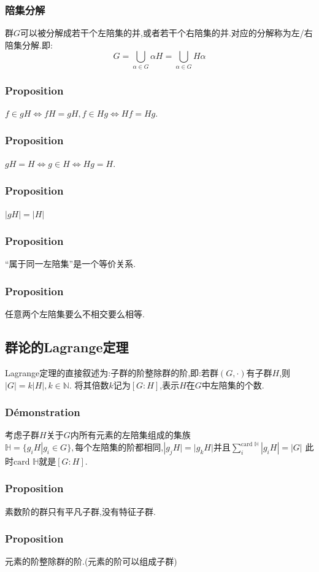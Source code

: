 \documentclass[12pt, a4paper, oneside]{ctexbook}
\begin{document}
  \subsubsection{陪集分解}
  群$G$可以被分解成若干个左陪集的并,或者若干个右陪集的并.对应的分解称为左/右陪集分解.即:
  $$
  G=\bigcup_{\alpha\in G}\alpha H= \bigcup_{\alpha\in G}H\alpha
  $$
  \subsubsection{Proposition}
  $f\in gH\Leftrightarrow fH=gH,f\in Hg\Leftrightarrow Hf=Hg$.
  \subsubsection{Proposition}
  $gH=H\Leftrightarrow g\in H\Leftrightarrow Hg=H$.
  \subsubsection{Proposition}
  $|gH|=|H|$
  \subsubsection{Proposition}
  “属于同一左陪集”是一个等价关系.
  \subsubsection{Proposition}
  任意两个左陪集要么不相交要么相等.

  \subsection{群论的Lagrange定理}
  Lagrange定理的直接叙述为:子群的阶整除群的阶,即:若群$(G,\cdot)$有子群$H$,则$|G|=k|H|,k\in\mathbb{N}$.
  将其倍数$k$记为$[G:H]$,表示$H$在$G$中左陪集的个数.
  \subsubsection{Démonstration}
  考虑子群$H$关于$G$内所有元素的左陪集组成的集族$\mathbb{H}=\{g_iH|g_i\in G\},\text{每个左陪集的阶都相同,}|g_jH|=|g_kH|$并且$\sum_{i}^{\text{card }\mathbb{H}}|g_iH|=|G|$
  此时$\text{card }\mathbb{H} $就是$[G:H]$.
  \subsubsection{Proposition}
  素数阶的群只有平凡子群,没有特征子群.
  \subsubsection{Proposition}
  元素的阶整除群的阶.(元素的阶可以组成子群)
\end{document}
